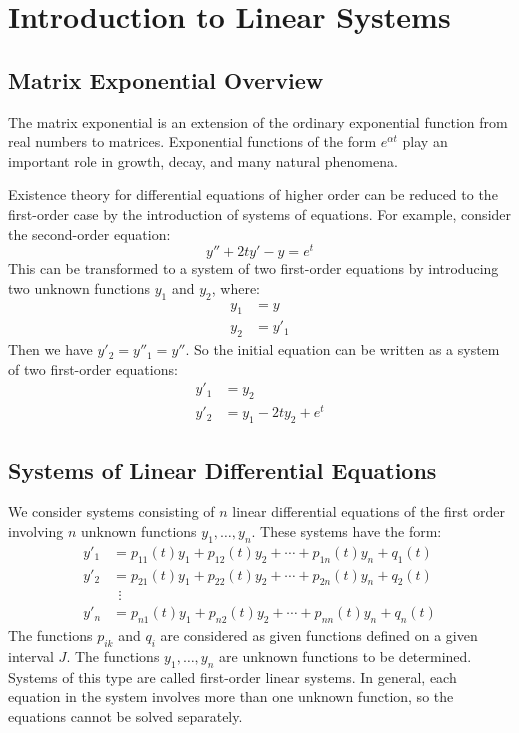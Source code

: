 \documentclass[12pt,a4paper]{report}
\theoremstyle{definition}
\numberwithin{equation}{chapter}
\begin{document}
\tableofcontents

\chapter{Introduction to Linear Systems}

\section{Matrix Exponential Overview}
The matrix exponential is an extension of the ordinary exponential function from real numbers to matrices. Exponential functions of the form $e^{\alpha t}$ play an important role in growth, decay, and many natural phenomena.

Existence theory for differential equations of higher order can be reduced to the first-order case by the introduction of systems of equations. For example, consider the second-order equation:
\begin{equation}
y'' + 2ty' - y = e^t
\end{equation}
This can be transformed to a system of two first-order equations by introducing two unknown functions $y_1$ and $y_2$, where:
\begin{equation}
\begin{aligned}
y_1 &= y \\
y_2 &= y'_1
\end{aligned}
\end{equation}
Then we have $y'_2 = y''_1 = y''$. So the initial equation can be written as a system of two first-order equations:
\begin{equation}
\begin{aligned}
y'_1 &= y_2 \\
y'_2 &= y_1 - 2ty_2 + e^t
\end{aligned}
\end{equation}

\section{Systems of Linear Differential Equations}
We consider systems consisting of $n$ linear differential equations of the first order involving $n$ unknown functions $y_1, \ldots, y_n$. These systems have the form:
\begin{equation}
\begin{aligned}
y'_1 &= p_{11}(t)y_1 + p_{12}(t)y_2 + \cdots + p_{1n}(t)y_n + q_1(t) \\
y'_2 &= p_{21}(t)y_1 + p_{22}(t)y_2 + \cdots + p_{2n}(t)y_n + q_2(t) \\
     &\ \ \vdots \\
y'_n &= p_{n1}(t)y_1 + p_{n2}(t)y_2 + \cdots + p_{nn}(t)y_n + q_n(t)
\end{aligned}
\end{equation}
The functions $p_{ik}$ and $q_i$ are considered as given functions defined on a given interval $J$. The functions $y_1, \ldots, y_n$ are unknown functions to be determined. Systems of this type are called first-order linear systems. In general, each equation in the system involves more than one unknown function, so the equations cannot be solved separately.
\end{document}
